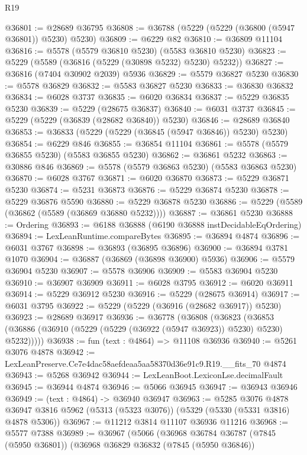 \begin{lexlean}{R19}
\begin{coremodule}
@36801 := @28689 @36795
@36808 := @36788 (@5229 (@5229 (@36800 (@5947 @36801)) @5230) @5230)
@36809 := @6229 @82
@36810 := @36809 @11104
@36816 := @5578 (@5579 @36810 @5230) (@5583 @36810 @5230)
@36823 := @5229 (@5589 (@36816 (@5229 (@30898 @5232) @5230) @5232))
@36827 := @36816 (@7404 @30902 @2039) @5936
@36829 := @5579 @36827 @5230
@36830 := @5578 @36829
@36832 := @5583 @36827 @5230
@36833 := @36830 @36832
@36834 := @6028 @3737
@36835 := @6020 @36834
@36837 := @5229 @36835 @5230
@36839 := @5229 (@28675 @36837)
@36840 := @6031 @3737
@36845 := @5229 (@5229 (@36839 (@28682 @36840)) @5230)
@36846 := @28689 @36840
@36853 := @36833 (@5229 (@5229 (@36845 (@5947 @36846)) @5230) @5230)
@36854 := @6229 @846
@36855 := @36854 @11104
@36861 := @5578 (@5579 @36855 @5230) (@5583 @36855 @5230)
@36862 := @36861 @5232
@36863 := @30886 @846
@36869 := @5578 (@5579 @36863 @5230) (@5583 @36863 @5230)
@36870 := @6028 @3767
@36871 := @6020 @36870
@36873 := @5229 @36871 @5230
@36874 := @5231 @36873
@36876 := @5229 @36874 @5230
@36878 := @5229 @36876 @5590
@36880 := @5229 @36878 @5230
@36886 := @5229 (@5589 (@36862 (@5589 (@36869 @36880 @5232))))
@36887 := @36861 @5230
@36888 := Ordering
@36893 := @6188 @36888 (@6190 @36888 instDecidableEqOrdering)
@36894 := LexLeanRuntime.compareBytes
@36895 := @36894 @4874
@36896 := @6031 @3767
@36898 := @36893 (@36895 @36896)
@36900 := @36894 @3781 @1070
@36904 := @36887 (@36869 (@36898 @36900) @5936)
@36906 := @5579 @36904 @5230
@36907 := @5578 @36906
@36909 := @5583 @36904 @5230
@36910 := @36907 @36909
@36911 := @6028 @3795
@36912 := @6020 @36911
@36914 := @5229 @36912 @5230
@36916 := @5229 (@28675 @36914)
@36917 := @6031 @3795
@36922 := @5229 (@5229 (@36916 (@28682 @36917)) @5230)
@36923 := @28689 @36917
@36936 := @36778
    (@36808
      (@36823 (@36853 (@36886 (@36910 (@5229 (@5229 (@36922 (@5947 @36923)) @5230) @5230) @5232)))))
@36938 := fun (text : @4864) => @11108 @36936
@36940 := @5261 @3076 @4878
@36942 := LexLeanPreserve.Ce7e4dac58aefdeaa5aa58370d36e91c9.R19.__fits_70 @4874
@36943 := @5268 @36942
@36944 := LexLeanBoot.LexiconLse.decimalFault
@36945 := @36944 @4874
@36946 := @5066 @36945
@36947 := @36943 @36946
@36949 := (text : @4864) -> @36940 @36947
@36963 := @5285
    @3076
    @4878
    @36947
    @3816
    @5962
    (@5313 (@5323 @3076))
    (@5329 (@5330 (@5331 @3816) @4878 @5306))
@36967 := @11212 @3814 @11107 @36936 @11216
@36968 := @5577 @7388
@36989 := @36967
    (@5066
      (@36968
        @36784
        @36787
        (@7845 (@5950 @36801))
        (@36968
          @36829
          @36832
          (@7845 (@5950 @36846))

\end{coremodule}
\end{lexlean}

